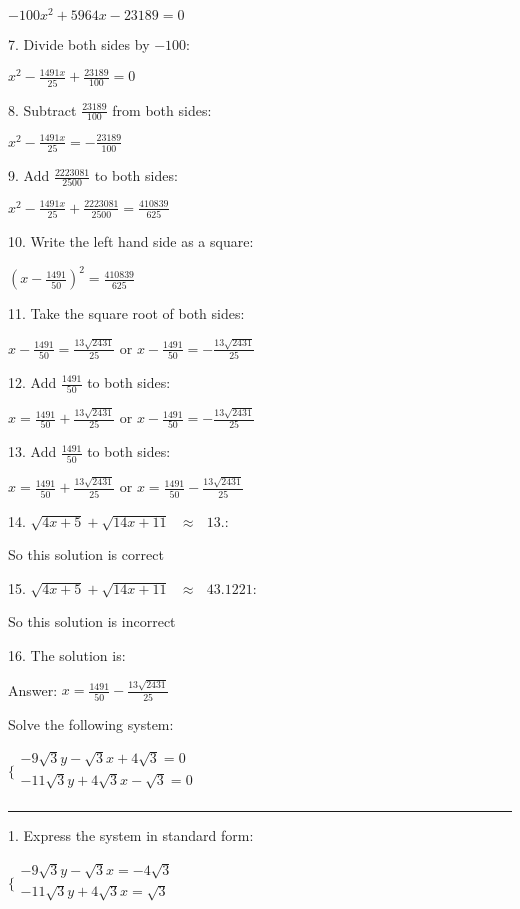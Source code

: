 \documentclass{article}
\begin{document}
$-100 x^2+5964 x-23189=0$

7. Divide both sides by $-100:$

$x^2-\frac{1491 x}{25}+\frac{23189}{100}=0$

8. Subtract $\frac{23189}{100}$ from both sides:

$x^2-\frac{1491 x}{25}=-\frac{23189}{100}$

9. Add $\frac{2223081}{2500}$ to both sides:

$x^2-\frac{1491 x}{25}+\frac{2223081}{2500}=\frac{410839}{625}$

10. Write the left hand side as a square:

$\left(x-\frac{1491}{50}\right)^2=\frac{410839}{625}$

11. Take the square root of both sides:

$x-\frac{1491}{50}=\frac{13 \sqrt{2431}}{25}\text{ or }x-\frac{1491}{50}=-\frac{13 \sqrt{2431}}{25}$

12. Add $\frac{1491}{50}$ to both sides:

$x=\frac{1491}{50}+\frac{13 \sqrt{2431}}{25}\text{ or }x-\frac{1491}{50}=-\frac{13 \sqrt{2431}}{25}$

13. Add $\frac{1491}{50}$ to both sides:

$x=\frac{1491}{50}+\frac{13 \sqrt{2431}}{25}\text{ or }x=\frac{1491}{50}-\frac{13 \sqrt{2431}}{25}$

14. $\sqrt{4 x+5}+\sqrt{14 x+11}\text{ $\approx $ }13.:$

So this solution is correct

15. $\sqrt{4 x+5}+\sqrt{14 x+11}\text{ $\approx $ }43.1221:$

So this solution is incorrect

16. The solution is:

Answer: $x=\frac{1491}{50}-\frac{13 \sqrt{2431}}{25}$

\pagebreak

Solve the following system:

$\{
        \begin{array}{l}
-9 \sqrt{3} y-\sqrt{3} x+4 \sqrt{3}=0  \\
            -11 \sqrt{3} y+4 \sqrt{3} x-\sqrt{3}=0 \\
        \end{array}$

\hrule

1. Express the system in standard form:

$\{
        \begin{array}{l}
-9 \sqrt{3} y-\sqrt{3} x=-4 \sqrt{3} \\
            -11 \sqrt{3} y+4 \sqrt{3} x=\sqrt{3} \\
        \end{array}$
\end{document}
